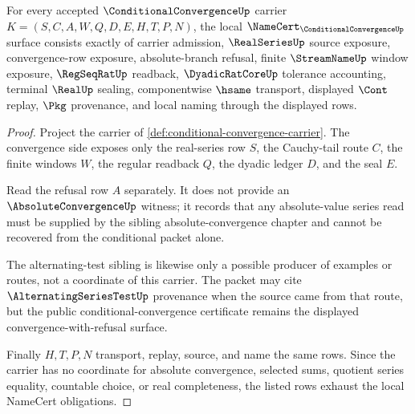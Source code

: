 \begin{theorem}
\label{thm:conditional-convergence-namecert-obligations}
For every accepted $\ConditionalConvergenceUp$ carrier $K=(S,C,A,W,Q,D,E,H,T,P,N)$, the local $\NameCert_{\ConditionalConvergenceUp}$ surface consists exactly of carrier admission, $\RealSeriesUp$ source exposure, convergence-row exposure, absolute-branch refusal, finite $\StreamNameUp$ window exposure, $\RegSeqRatUp$ readback, $\DyadicRatCoreUp$ tolerance accounting, terminal $\RealUp$ sealing, componentwise $\hsame$ transport, displayed $\Cont$ replay, $\Pkg$ provenance, and local naming through the displayed rows.
\end{theorem}
\begin{proof}
Project the carrier of \autoref{def:conditional-convergence-carrier}. The convergence side exposes only the real-series row $S$, the Cauchy-tail route $C$, the finite windows $W$, the regular readback $Q$, the dyadic ledger $D$, and the seal $E$.

Read the refusal row $A$ separately. It does not provide an $\AbsoluteConvergenceUp$ witness; it records that any absolute-value series read must be supplied by the sibling absolute-convergence chapter and cannot be recovered from the conditional packet alone.

The alternating-test sibling is likewise only a possible producer of examples or routes, not a coordinate of this carrier. The packet may cite $\AlternatingSeriesTestUp$ provenance when the source came from that route, but the public conditional-convergence certificate remains the displayed convergence-with-refusal surface.

Finally $H,T,P,N$ transport, replay, source, and name the same rows. Since the carrier has no coordinate for absolute convergence, selected sums, quotient series equality, countable choice, or real completeness, the listed rows exhaust the local NameCert obligations.
\end{proof}

